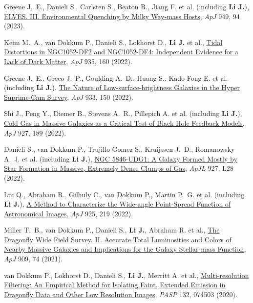 {\item Greene J.~E., Danieli S., Carlsten S., Beaton R., Jiang F. et al. (including \textbf{Li J.}), \href{https://ui.adsabs.harvard.edu/abs/2023ApJ...949...94G}{ELVES. III. Environmental Quenching by Milky Way-mass Hosts}, \textit{ApJ} 949, 94 (2023).

\item Keim M.~A., van Dokkum P., Danieli S., Lokhorst D., \textbf{Li J.} et al., \href{https://ui.adsabs.harvard.edu/abs/2022ApJ...935..160K}{Tidal Distortions in NGC1052-DF2 and NGC1052-DF4: Independent Evidence for a Lack of Dark Matter}, \textit{ApJ} 935, 160 (2022).

\item Greene J.~E., Greco J.~P., Goulding A.~D., Huang S., Kado-Fong E. et al. (including \textbf{Li J.}), \href{https://ui.adsabs.harvard.edu/abs/2022ApJ...933..150G}{The Nature of Low-surface-brightness Galaxies in the Hyper Suprime-Cam Survey}, \textit{ApJ} 933, 150 (2022).

\item Shi J., Peng Y., Diemer B., Stevens A.~R., Pillepich A. et al. (including \textbf{Li J.}), \href{https://ui.adsabs.harvard.edu/abs/2022ApJ...927..189S}{Cold Gas in Massive Galaxies as a Critical Test of Black Hole Feedback Models}, \textit{ApJ} 927, 189 (2022).

\item Danieli S., van Dokkum P., Trujillo-Gomez S., Kruijssen J.~D., Romanowsky A.~J. et al. (including \textbf{Li J.}), \href{https://ui.adsabs.harvard.edu/abs/2022ApJ...927L..28D}{NGC 5846-UDG1: A Galaxy Formed Mostly by Star Formation in Massive, Extremely Dense Clumps of Gas}, \textit{ApJL} 927, L28 (2022).

\item Liu Q., Abraham R., Gilhuly C., van Dokkum P., Martin P.~G. et al. (including \textbf{Li J.}), \href{https://ui.adsabs.harvard.edu/abs/2022ApJ...925..219L}{A Method to Characterize the Wide-angle Point-Spread Function of Astronomical Images}, \textit{ApJ} 925, 219 (2022).

\item Miller T.~B., van Dokkum P., Danieli S., \textbf{Li J.}, Abraham R. et al., \href{https://ui.adsabs.harvard.edu/abs/2021ApJ...909...74M}{The Dragonfly Wide Field Survey. II. Accurate Total Luminosities and Colors of Nearby Massive Galaxies and Implications for the Galaxy Stellar-mass Function}, \textit{ApJ} 909, 74 (2021).

\item van Dokkum P., Lokhorst D., Danieli S., \textbf{Li J.}, Merritt A. et al., \href{https://ui.adsabs.harvard.edu/abs/2020PASP..132g4503V}{Multi-resolution Filtering: An Empirical Method for Isolating Faint, Extended Emission in Dragonfly Data and Other Low Resolution Images}, \textit{PASP} 132, 074503 (2020).

}
